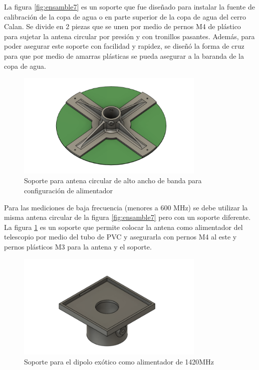 La figura \ref{fig:ensamble7} es un soporte que fue diseñado para instalar la fuente de calibración de la copa de agua o  en parte superior de la copa de agua del cerro Calan. Se divide en 2 piezas que se unen por medio de pernos M4 de plástico para sujetar la antena circular por presión y con tronillos pasantes. Además, para poder asegurar este soporte con facilidad y rapidez, se diseñó la forma de cruz para que por medio de amarras plásticas se pueda asegurar a la baranda de la copa de agua.\\

\begin{figure}
    \centering
    \includegraphics[width=0.8\textwidth]{img/soporte3D2}
    \caption{Soporte para antena circular de alto ancho de banda para configuración de alimentador}
    \label{fig:ensamble8}
\end{figure}

Para las mediciones de baja frecuencia (menores a 600 MHz) se debe utilizar la misma antena circular de la figura \ref{fig:ensamble7} pero con un soporte diferente. La figura \ref{fig:ensamble8} es un soporte que permite colocar la antena como alimentador del telescopio por medio del tubo de PVC y asegurarla con pernos M4 al este y pernos plásticos M3 para la antena y el soporte.\\

\begin{figure}
    \centering
    \includegraphics[width=0.8\textwidth]{img/soporte3D6}
    \caption{Soporte para el dipolo exótico como alimentador de 1420MHz}
    \label{fig:ensamble9}
\end{figure}

